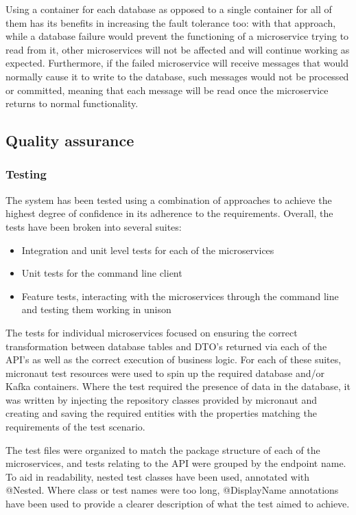 \documentclass[parskip=full]{article}
\begin{document}
    Using a container for each database as opposed to a single container for all of them has its benefits in increasing the fault tolerance too: with that approach, while a database failure would prevent the functioning of a microservice trying to read from it, other microservices will not be affected and will continue working as expected.
    Furthermore, if the failed microservice will receive messages that would normally cause it to write to the database, such messages would not be processed or committed, meaning that each message will be read once the microservice returns to normal functionality.

    \pagebreak
    \subsection{Quality assurance}
    \subsubsection{Testing}
    The system has been tested using a combination of approaches to achieve the highest degree of confidence in its adherence to the requirements.
    Overall, the tests have been broken into several suites:
    \begin{itemize}
        \item Integration and unit level tests for each of the microservices
        \item Unit tests for the command line client
        \item Feature tests, interacting with the microservices through the command line and testing them working in unison
    \end{itemize}
    The tests for individual microservices focused on ensuring the correct transformation between database tables and DTO's returned via each of the API's as well as the correct execution of business logic.
    For each of these suites, micronaut test resources were used to spin up the required database and/or Kafka containers.
    Where the test required the presence of data in the database, it  was written by injecting the repository classes provided by micronaut and creating and saving the required entities with the properties matching the requirements of the test scenario.

    The test files were organized to match the package structure of each of the microservices, and tests relating to the API were grouped by the endpoint name.
    To aid in readability, nested test classes have been used, annotated with @Nested.
    Where class or test names were too long, @DisplayName annotations have been used to provide a clearer description of what the test aimed to achieve.
\end{document}
